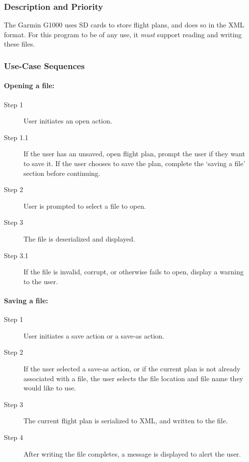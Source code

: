 \documentclass[12pt, letterpaper]{article}
\begin{document}
          \subsubsection{Description and Priority}
            The Garmin G1000 uses SD cards to store flight plans, and does so in the XML format.
            For this program to be of any use, it \emph{must} support reading and writing these files.
          \subsubsection{Use-Case Sequences}
            \paragraph{Opening a file:}
            \begin{description}
              \item[Step 1] User initiates an open action.
              \item[Step 1.1] If the user has an unsaved, open flight plan, prompt the user if they want to save it.
                If the user chooses to save the plan, complete the `saving a file' section before continuing.
              \item[Step 2] User is prompted to select a file to open.
              \item[Step 3] The file is deserialized and displayed.
              \item[Step 3.1] If the file is invalid, corrupt, or otherwise fails to open, display a warning to the user.
            \end{description}
            \paragraph{Saving a file:}
            \begin{description}
              \item[Step 1] User initiates a save action or a save-as action.
              \item[Step 2] If the user selected a save-as action, or if the current plan is not already associated with a file,
                the user selects the file location and file name they would like to use.
              \item[Step 3] The current flight plan is serialized to XML, and written to the file.
              \item[Step 4] After writing the file completes, a message is displayed to alert the user.
            \end{description}
\end{document}
